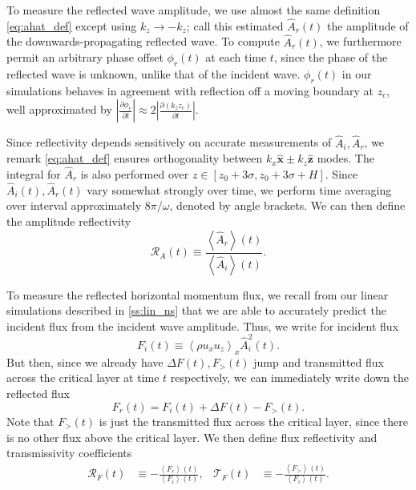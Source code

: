 \documentclass[
        fleqn,
        usenatbib,
    ]{mnras}
\newcommand*{\pd}[2]{\frac{\partial#1}{\partial#2}}
\newcommand*{\abs}[1]{\left|#1\right|}
\newcommand*{\ev}[1]{\left\langle#1\right\rangle}
\newcommand*{\uv}[1]{\hat{\boldsymbol{\mathbf{#1}}}}
\begin{document}
To measure the reflected wave amplitude, we use almost the same definition
\autoref{eq:ahat_def} except using $k_{z} \to -k_{z}$; call this estimated
$\hat{A}_r(t)$ the amplitude of the downwards-propagating reflected wave. To
compute $\hat{A}_r(t)$, we furthermore permit an arbitrary phase offset
$\phi_r(t)$ at each time $t$, since the phase of the reflected wave is unknown,
unlike that of the incident wave. $\phi_r(t)$ in our simulations
behaves in agreement with reflection off a moving boundary at $z_c$,
well approximated by $\abs{\pd{\phi_r}{t}} \approx 2\abs{\pd{(k_{z}z_c)}{t}}$.

Since reflectivity depends sensitively on accurate measurements of $\hat{A}_i,
\hat{A}_r$, we remark \autoref{eq:ahat_def} ensures orthogonality between
$k_{x}\uv{x} \pm k_{z}\uv{z}$ modes. The integral for $\hat{A}_r$ is also
performed over $z \in [z_0 + 3\sigma, z_0 + 3\sigma + H]$. Since
$\hat{A}_i(t), \hat{A}_r(t)$ vary somewhat strongly over time, we perform time
averaging over interval approximately $8\pi/\omega$, denoted by angle brackets.
We can then define the amplitude reflectivity
\begin{equation}
    \mathcal{R}_A(t) \equiv \frac{\ev{\hat{A}_r}(t)}{\ev{\hat{A}_i}(t)}
        .\label{eq:Ra_def}
\end{equation}

To measure the reflected horizontal momentum flux, we recall from our linear
simulations described in \autoref{ss:lin_ns} that we are able to accurately
predict the incident flux from the incident wave amplitude. Thus, we write for
incident flux
\begin{equation}
    F_i(t) \equiv \ev{\rho u_{x} u_{z}}_x\hat{A}_i^2(t).
\end{equation}
But then, since we already have $\Delta F(t), F_>(t)$ jump and transmitted flux
across the critical layer at time $t$ respectively, we can immediately write
down the reflected flux
\begin{equation}
    F_r(t) = F_i(t) + \Delta F(t) - F_>(t).
\end{equation}
Note that $F_>(t)$ is just the transmitted flux across the critical layer, since
there is no other flux above the critical layer. We then define flux
reflectivity and transmissivity coefficients
\begin{align}
    \mathcal{R}_F(t) &\equiv -\frac{\ev{F_r}(t)}{\ev{F_i}(t)},&
    \mathcal{T}_F(t) &\equiv -\frac{\ev{F_>}(t)}{\ev{F_i}(t)}.
        \label{eq:srefl_def}
\end{align}
\end{document}
